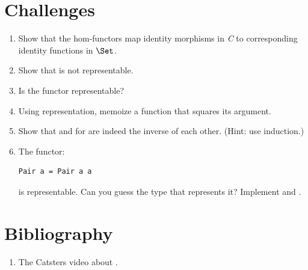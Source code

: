 \section{Challenges}

\begin{enumerate}
\tightlist
\item
  Show that the hom-functors map identity morphisms in \emph{C} to
  corresponding identity functions in $\Set$.
\item
  Show that  is not representable.
\item
  Is the  functor representable?
\item
  Using  representation, memoize a function that squares
  its argument.
\item
  Show that  and  for  are
  indeed the inverse of each other. (Hint: use induction.)
\item
  The functor:

\begin{Verbatim}
Pair a = Pair a a
\end{Verbatim}
  is representable. Can you guess the type that represents it? Implement
   and .
\end{enumerate}

\section{Bibliography}

\begin{enumerate}
\tightlist
\item
  The Catsters video about
  .
\end{enumerate}
